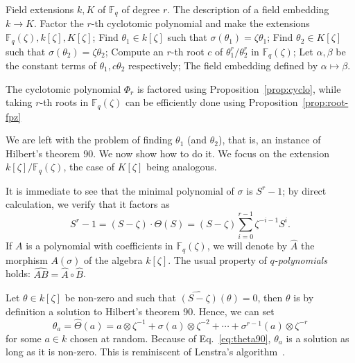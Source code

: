 \documentclass[12pt]{article}
\theoremstyle{plain}
\theoremstyle{definition}
\def\F{\ensuremath{\mathbb{F}}}
\newcounter{algorithm}
\begin{document}
\begin{algorithm}
	\begin{algorithmic}[1]
		\REQUIRE Field extensions $k, K$ of $\F_q$ of degree $r$.
		\ENSURE The description of a field embedding $k\to K$.
		\STATE Factor the $r$-th cyclotomic polynomial and make the extensions $\F_q(\zeta), 
		k[\zeta], K[\zeta]$;
		\STATE Find $\theta_1 \in k[\zeta]$ such that $\sigma(\theta_1) = \zeta\theta_1$;
		\STATE Find $\theta_2 \in K[\zeta]$ such that $\sigma(\theta_2) = \zeta\theta_2$;
		\STATE Compute an $r$-th root $c$ of $\theta_1^r / \theta_2^r$ in $\F_q(\zeta)$;
		\STATE Let $\alpha, \beta$ be the constant terms of $\theta_1, c\theta_2$ respectively;
		\RETURN The field embedding defined by $\alpha\mapsto\beta$.
	\end{algorithmic}
        \label{alog:allombert}
\end{algorithm}

The cyclotomic polynomial $\Phi_r$ is factored using Proposition~\ref{prop:cyclo}, while
taking $r$-th roots in $\F_q(\zeta)$ can be efficiently done using 
Proposition~\ref{prop:root-fpz}

We are left with the problem of finding $\theta_1$ (and $\theta_2$), that is, an instance of Hilbert's theorem 90.
We now show how to do it.
We focus on the extension $k[\zeta]/\F_q(\zeta)$, the case of
$K[\zeta]$ being analogous.

It is immediate to see that the minimal polynomial of $\sigma$ is
$S^r-1$; by direct calculation, we verify that it factors as
\begin{equation}
  \label{eq:theta90}
  S^r-1 = (S-\zeta)\cdot\Theta(S) =
  (S-\zeta)\sum_{i=0}^{r-1} \zeta^{-i-1}S^i. 
\end{equation}
If $A$ is a polynomial with coefficients in $\F_q(\zeta)$, we will
denote by $\hat{A}$ the morphism $A(\sigma)$ of the algebra
$k[\zeta]$. %
The usual property of \emph{$q$-polynomials} holds:
$\widehat{AB} = \hat{A}\circ\hat{B}$.

Let $\theta\in k[\zeta]$ be non-zero and such that $\widehat{(S-\zeta)}(\theta)=0$,
then $\theta$ is by definition a solution to Hilbert's
theorem 90. %
Hence, we can set
\begin{equation}
  \label{eq:thetaa}
  \theta_a = \hat\Theta(a)
  =  a\otimes\zeta^{-1} + \sigma(a)\otimes\zeta^{-2} + \cdots + \sigma^{r-1}(a)\otimes\zeta^{-r}
\end{equation}
for some $a\in k$ chosen at random. %
Because of Eq.~\eqref{eq:theta90}, $\theta_a$ is a solution as long as
it is non-zero. %
This is reminiscent of Lenstra's algorithm~\cite[Th.~5.2]{LenstraJr91}.
\end{document}
